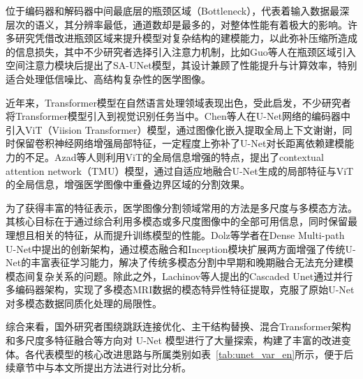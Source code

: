 位于编码器和解码器中间最底层的瓶颈区域（Bottleneck），代表着输入数据最深层次的语义，其分辨率最低，通道数却是最多的，对整体性能有着极大的影响。许多研究凭借改进瓶颈区域来提升模型对复杂结构的建模能力，以此弥补压缩所造成的信息损失，其中不少研究者选择引入注意力机制，比如Guo等人\cite{guo2021}在瓶颈区域引入空间注意力模块后提出了SA-UNet模型，其设计兼顾了性能提升与计算效率，特别适合处理低信噪比、高结构复杂性的医学图像。

近年来，Transformer模型在自然语言处理领域表现出色，受此启发，不少研究者将Transformer模型引入到视觉识别任务当中。Chen等人\cite{chen2021}在U-Net网络的编码器中引入ViT（Viision Transformer）模型，通过图像化嵌入提取全局上下文谢谢，同时保留卷积神经网络增强局部特征，一定程度上弥补了U-Net对长距离依赖建模能力的不足。Azad等人\cite{azad2022}则利用ViT的全局信息增强的特点，提出了contextual attention network（TMU）模型，通过自适应地融合U-Net生成的局部特征与ViT的全局信息，增强医学图像中重叠边界区域的分割效果。


为了获得丰富的特征表示，医学图像分割领域常用的方法是多尺度与多模态方法。其核心目标在于通过综合利用多模态或多尺度图像中的全部可用信息，同时保留最理想且相关的特征，从而提升训练模型的性能。Dolz\cite{dolz2018}等学者在Dense Multi-path U-Net中提出的创新架构，通过模态融合和Inception模块扩展两方面增强了传统U-Net的丰富表征学习能力，解决了传统多模态分割中早期和晚期融合无法充分建模模态间复杂关系的问题。除此之外，Lachinov等人\cite{lachinov2019}提出的Cascaded Unet通过并行多编码器架构，实现了多模态MRI数据的模态特异性特征提取，克服了原始U-Net对多模态数据同质化处理的局限性。

综合来看，国外研究者围绕跳跃连接优化、主干结构替换、混合Transformer架构和多尺度多特征融合等方向对 U-Net 模型进行了大量探索，构建了丰富的改进变体。各代表模型的核心改进思路与所属类别如表~\ref{tab:unet_var_en}所示，便于后续章节中与本文所提出方法进行对比分析。

